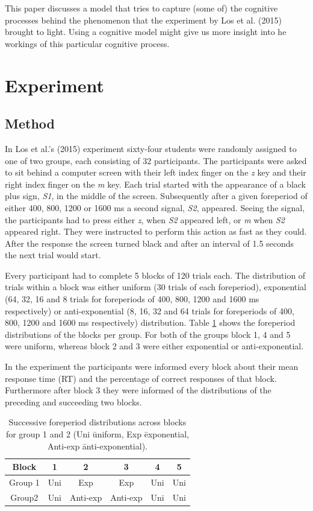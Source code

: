 \documentclass[10pt,letterpaper]{article}
\begin{document}
This paper discusses a model that tries to capture (some of) the cognitive processes behind the phenomenon that the experiment by Los et al. (2015) brought to light. Using a cognitive model might give us more insight into he workings of this particular cognitive process.

\section{Experiment}
\subsection{Method}
In Los et al.'s (2015) experiment sixty-four students were randomly assigned to one of two groups, each consisting of 32 participants. The participants were asked to sit behind a computer screen with their left index finger on the \textit{z} key and their right index finger on the \textit{m} key. Each trial started with the appearance of a black plus sign, \textit{S1}, in the middle of the screen. Subsequently after a given foreperiod of either 400, 800, 1200 or 1600 ms a second signal, \textit{S2}, appeared. Seeing the signal, the participants had to press either \textit{z}, when \textit{S2} appeared left, or \textit{m} when \textit{S2} appeared right. They were instructed to perform this action as fast as they could. After the response the screen turned black and after an interval of 1.5 seconds the next trial would start.

Every participant had to complete 5 blocks of 120 trials each. The distribution of trials within a block was either uniform (30 trials of each foreperiod), exponential (64, 32, 16 and 8 trials for foreperiods of 400, 800, 1200 and 1600 ms respectively) or anti-exponential (8, 16, 32 and 64 trials for foreperiods of 400, 800, 1200 and 1600 ms respectively) distribution. Table \ref{Table1} shows the foreperiod distributions of the blocks per group. For both of the groups block 1, 4 and 5 were uniform, whereas block 2 and 3 were either exponential or anti-exponential.

In the experiment the participants were informed every block about their mean response time (RT) and the percentage of correct responses of that block. Furthermore after block 3 they were informed of the distributions of the preceding and succeeding two blocks.

\begin{table}
	\centering
	\caption{Successive foreperiod distributions across blocks for group 1 and 2 (Uni \= uniform, Exp \= exponential, Anti-exp \= anti-exponential).}
	\begin{tabular}{c|c|c|c|c|c}
		Block & 1 & 2 & 3 & 4 & 5 \\
		\hline
		Group 1 & Uni & Exp & Exp & Uni & Uni \\
		Group2 & Uni & Anti-exp & Anti-exp & Uni & Uni
	\end{tabular}
	\label{Table1}
\end{table}
\end{document}
